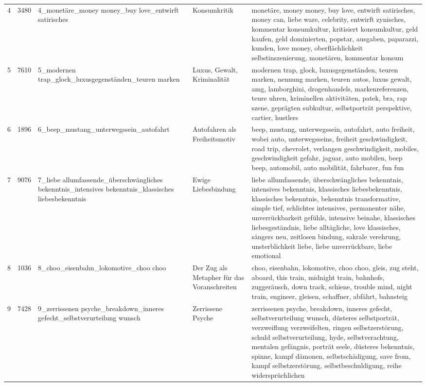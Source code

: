 \begin{longtable}{rrlll}
4 & 3480 & 4\_monetäre\_money money\_buy love\_entwirft satirisches & Konsumkritik & monetäre, money money, buy love, entwirft satirisches, money can, liebe ware, celebrity, entwirft zynisches, kommentar konsumkultur, kritisiert konsumkultur, geld kaufen, geld dominierten, popstar, ausgaben, paparazzi, kunden, love money, oberflächlichkeit selbstinszenierung, monetären, kommentar konsum \\
5 & 7610 & 5\_modernen trap\_glock\_luxusgegenständen\_teuren marken & Luxus, Gewalt, Kriminalität & modernen trap, glock, luxusgegenständen, teuren marken, nennung marken, teuren autos, luxus gewalt, amg, lamborghini, drogenhandels, markenreferenzen, teure uhren, kriminellen aktivitäten, patek, bra, rap szene, geprägten subkultur, selbstporträt perspektive, cartier, hustlers \\
6 & 1896 & 6\_beep\_mustang\_unterwegssein\_autofahrt & Autofahren als Freiheitsmotiv & beep, mustang, unterwegssein, autofahrt, auto freiheit, wobei auto, unterwegsseins, freiheit geschwindigkeit, road trip, chevrolet, verlangen geschwindigkeit, mobiles, geschwindigkeit gefahr, jaguar, auto mobilen, beep beep, automobil, auto mobilität, fahrbarer, fun fun \\
7 & 9076 & 7\_liebe allumfassende\_überschwängliches bekenntnis\_intensives bekenntnis\_klassisches liebesbekenntnis & Ewige Liebesbindung & liebe allumfassende, überschwängliches bekenntnis, intensives bekenntnis, klassisches liebesbekenntnis, klassisches bekenntnis, bekenntnis transformative, simple tief, schlichtes intensives, permanenter nähe, unverrückbarkeit gefühls, intensive beinahe, klassisches liebesgeständnis, liebe alltägliche, love klassisches, sängers neu, zeitlosen bindung, sakrale verehrung, unsterblichkeit liebe, liebe unverrückbare, liebe emotional \\
8 & 1036 & 8\_choo\_eisenbahn\_lokomotive\_choo choo & Der Zug als Metapher für das Voranschreiten & choo, eisenbahn, lokomotive, choo choo, gleis, zug steht, aboard, this train, midnight train, bahnhofs, zuggeräusch, down track, schiene, trouble mind, night train, engineer, gleisen, schaffner, abfährt, bahnsteig \\
9 & 7428 & 9\_zerrissenen psyche\_breakdown\_inneres gefecht\_selbstverurteilung wunsch & Zerrissene Psyche & zerrissenen psyche, breakdown, inneres gefecht, selbstverurteilung wunsch, düsteres selbstporträt, verzweiflung verzweifelten, ringen selbstzerstörung, schuld selbstverurteilung, hyde, selbstverachtung, mentalen gefängnis, porträt seele, düsteres bekenntnis, spinne, kampf dämonen, selbstschädigung, save from, kampf selbstzerstörung, selbstbeschuldigung, reihe widersprüchlichen \\

\end{longtable}
